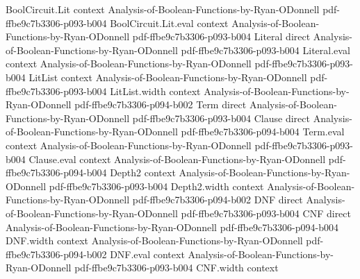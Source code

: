 \begin{lemma}
\label{BooleanAnalysis.GaussianSpace.hasInvarianceMoments_uniformBoolCoordinate}
\leanok
{}
\proofstep
  {BoolCircuit.Lit}
  {context}
  {Analysis-of-Boolean-Functions-by-Ryan-ODonnell}
  {pdf-ffbe9c7b3306-p093-b004}
\proofstep
  {BoolCircuit.Lit.eval}
  {context}
  {Analysis-of-Boolean-Functions-by-Ryan-ODonnell}
  {pdf-ffbe9c7b3306-p093-b004}
\proofstep
  {Literal}
  {direct}
  {Analysis-of-Boolean-Functions-by-Ryan-ODonnell}
  {pdf-ffbe9c7b3306-p093-b004}
\proofstep
  {Literal.eval}
  {context}
  {Analysis-of-Boolean-Functions-by-Ryan-ODonnell}
  {pdf-ffbe9c7b3306-p093-b004}
\proofstep
  {LitList}
  {context}
  {Analysis-of-Boolean-Functions-by-Ryan-ODonnell}
  {pdf-ffbe9c7b3306-p093-b004}
\proofstep
  {LitList.width}
  {context}
  {Analysis-of-Boolean-Functions-by-Ryan-ODonnell}
  {pdf-ffbe9c7b3306-p094-b002}
\proofstep
  {Term}
  {direct}
  {Analysis-of-Boolean-Functions-by-Ryan-ODonnell}
  {pdf-ffbe9c7b3306-p093-b004}
\proofstep
  {Clause}
  {direct}
  {Analysis-of-Boolean-Functions-by-Ryan-ODonnell}
  {pdf-ffbe9c7b3306-p094-b004}
\proofstep
  {Term.eval}
  {context}
  {Analysis-of-Boolean-Functions-by-Ryan-ODonnell}
  {pdf-ffbe9c7b3306-p093-b004}
\proofstep
  {Clause.eval}
  {context}
  {Analysis-of-Boolean-Functions-by-Ryan-ODonnell}
  {pdf-ffbe9c7b3306-p094-b004}
\proofstep
  {Depth2}
  {context}
  {Analysis-of-Boolean-Functions-by-Ryan-ODonnell}
  {pdf-ffbe9c7b3306-p093-b004}
\proofstep
  {Depth2.width}
  {context}
  {Analysis-of-Boolean-Functions-by-Ryan-ODonnell}
  {pdf-ffbe9c7b3306-p094-b002}
\proofstep
  {DNF}
  {direct}
  {Analysis-of-Boolean-Functions-by-Ryan-ODonnell}
  {pdf-ffbe9c7b3306-p093-b004}
\proofstep
  {CNF}
  {direct}
  {Analysis-of-Boolean-Functions-by-Ryan-ODonnell}
  {pdf-ffbe9c7b3306-p094-b004}
\proofstep
  {DNF.width}
  {context}
  {Analysis-of-Boolean-Functions-by-Ryan-ODonnell}
  {pdf-ffbe9c7b3306-p094-b002}
\proofstep
  {DNF.eval}
  {context}
  {Analysis-of-Boolean-Functions-by-Ryan-ODonnell}
  {pdf-ffbe9c7b3306-p093-b004}
\proofstep
  {CNF.width}
  {context}

\end{lemma}
